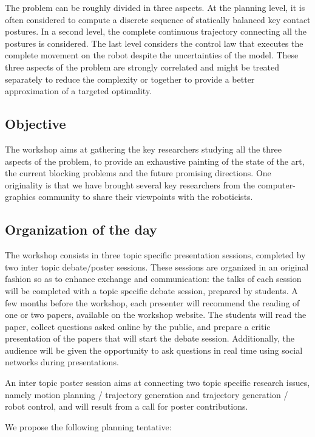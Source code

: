 \documentclass[conference]{IEEEtran}
\begin{document}
The problem can be roughly divided in three aspects. At the planning level, it is often considered to compute a discrete sequence of statically balanced key contact postures. In a second level, the complete continuous trajectory connecting all the postures is considered. The last level considers the control law that executes the complete movement on the robot despite the uncertainties of the model. These three aspects of the problem are strongly correlated and might be treated separately to reduce the complexity or together to provide a better approximation of a targeted optimality.

\subsection{Objective}
The workshop aims at gathering the key researchers studying all the three aspects of the problem, to provide an exhaustive painting of the state of the art, the current blocking problems and the future promising directions. One originality is that we have brought several key researchers from the computer-graphics community to share their viewpoints with the roboticists.

\subsection{Organization of the day}
The workshop consists in three topic specific presentation sessions, completed by two inter topic debate/poster sessions. These sessions are organized in an original fashion so as to enhance exchange and communication: the talks of each session will be completed with a topic specific
debate session, prepared by students.
A few months before the workshop, each presenter will recommend the reading of one or two papers, available on the workshop website. 
The students will read the paper, collect questions asked online by the public, and prepare a critic presentation of the papers that will start the debate session. Additionally, the audience will be given the opportunity to ask questions in real time using social networks during presentations.

An inter topic poster session aims at connecting two topic specific research issues, namely motion planning / trajectory generation and trajectory generation / robot control, and will result from a call for poster contributions.

We propose the following planning tentative: \\
\end{document}
